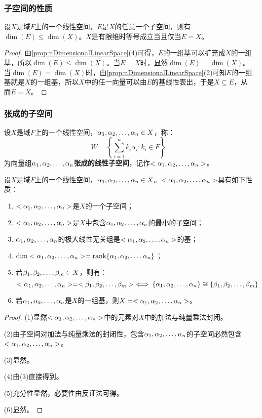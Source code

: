 \subsubsection{子空间的性质}
\begin{theorem}\label{theo:DimSubspace}
	设$X$是域$F$上的一个线性空间，$E$是$X$的任意一个子空间，则有$\dim(E)\leqslant\dim(X)$。$X$是有限维时等号成立当且仅当$E=X$。
\end{theorem}
\begin{proof}
	由\cref{prop:nDimensionalLinearSpace}(4)可得，$E$的一组基可以扩充成$X$的一组基，所以$\dim(E)\leqslant\dim(X)$。当$E=X$时，显然$\dim(E)=\dim(X)$。当$\dim(E)=\dim(X)$时，由\cref{prop:nDimensionalLinearSpace}(2)可知$E$的一组基就是$X$的一组基，所以$X$中的任一向量可以由$E$的基线性表出，于是$X\subseteq E$，从而$E=X$。
\end{proof}
\subsubsection{张成的子空间}
\begin{definition}
	设$X$是域$F$上的一个线性空间，$\alpha_1, \alpha_2, \dots, \alpha_{n}\in X$，称：
	\begin{equation*}
		W=\left\{\sum_{i=1}^{n}k_i\alpha_i:k_i\in F\right\}
	\end{equation*}
	为向量组$\alpha_1, \alpha_2, \dots, \alpha_{n}$\textbf{张成的线性子空间}，记作$<\alpha_1, \alpha_2, \dots, \alpha_{n}>$。
\end{definition}
\begin{property}\label{prop:SpanSubspace}
	设$X$是域$F$上的一个线性空间，$\alpha_1, \alpha_2, \dots, \alpha_{n}\in X$。$<\alpha_1, \alpha_2, \dots, \alpha_{n}>$具有如下性质：
	\begin{enumerate}
		\item $<\alpha_1, \alpha_2, \dots, \alpha_{n}>$是$X$的一个子空间；
		\item $<\alpha_1, \alpha_2, \dots, \alpha_{n}>$是$X$中包含$\alpha_1, \alpha_2, \dots, \alpha_{n}$的最小的子空间；
		\item $\alpha_1, \alpha_2, \dots, \alpha_{n}$的极大线性无关组是$<\alpha_1, \alpha_2, \dots, \alpha_{n}>$的基；
		\item $\operatorname{dim}<\alpha_1, \alpha_2, \dots, \alpha_{n}>=\operatorname{rank}\{\alpha_1, \alpha_2, \dots, \alpha_{n}\}$；
		\item 若$\beta_1, \beta_2, \dots, \beta_{m}\in X$，则有：
		\begin{equation*}
			<\alpha_1, \alpha_2, \dots, \alpha_{n}>=<\beta_1, \beta_2, \dots, \beta_{m}>\iff\{\alpha_1, \alpha_2, \dots, \alpha_{n}\}\cong\{\beta_1, \beta_2, \dots, \beta_{m}\}
		\end{equation*}
		\item 若$\alpha_1, \alpha_2, \dots, \alpha_{n}$是$X$的一组基，则$X=<\alpha_1, \alpha_2, \dots, \alpha_{n}>$。
	\end{enumerate}
\end{property}
\begin{proof}
	(1)显然$<\alpha_1, \alpha_2, \dots, \alpha_{n}>$中的元素对$X$中的加法与纯量乘法封闭。\par
	(2)由子空间对加法与纯量乘法的封闭性，包含$\alpha_1, \alpha_2, \dots, \alpha_{n}$的子空间必然包含$<\alpha_1, \alpha_2, \dots, \alpha_{n}>$。\par
	(3)显然。\par
	(4)由(3)直接得到。\par
	(5)充分性显然，必要性由反证法可得。\par
	(6)显然。
\end{proof}
